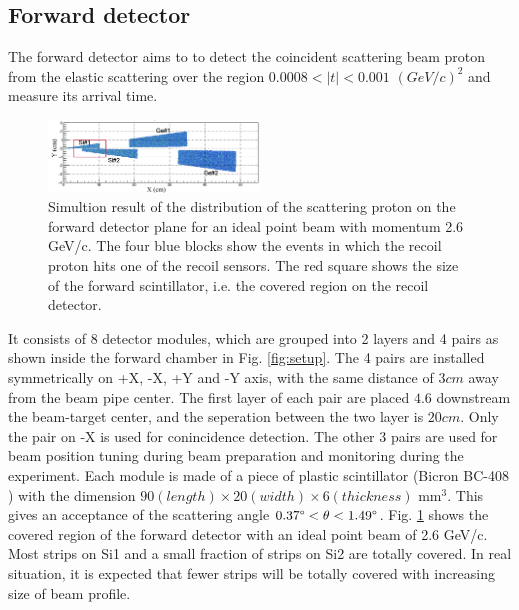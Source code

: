\documentclass[number,5p]{elsarticle}
\begin{document}
\subsection{Forward detector}
\label{sec:fwd}

The forward detector aims to to detect the coincident scattering beam proton
from the elastic scattering over the region \(0.0008 < |t| < 0.001\)
\((GeV/c)^2\) and measure its arrival time.

\begin{figure}[htbp]
  \centering
  \includegraphics[width=0.5\textwidth]{./fwd_acceptance.png}
  \caption{Simultion result of the distribution of the scattering proton on
    the forward detector plane for an ideal point beam with momentum 2.6 GeV/c.
    The four blue blocks show the events in which the recoil proton hits one of the recoil sensors.
    The red square shows the size of the forward scintillator, i.e. the covered
    region on the recoil detector.}
  \label{fig:forward_acceptance}
\end{figure}

It consists of 8 detector modules, which are grouped into 2 layers and 4 pairs
as shown inside the forward chamber in Fig. \ref{fig:setup}.
The 4 pairs are installed symmetrically on +X, -X, +Y and -Y axis, with the same
distance of $3 cm$ away from the beam pipe center.
The first layer of each pair are placed $4.6$ downstream the
beam-target center, and the seperation between the two layer is $20 cm$.
Only the pair on -X is used for conincidence detection.
The other 3 pairs are used for beam position tuning during beam preparation and
monitoring during the experiment.
Each module is made of a piece of plastic scintillator (Bicron BC-408
\cite{bc408}) with the dimension \(90 (length) \times 20 (width) \times 6 (thickness)\) mm$^3$.
This gives an acceptance of the scattering angle \(0.37\degree < \theta < 1.49\degree\).
Fig. \ref{fig:forward_acceptance} shows the covered region of the forward detector with an ideal point beam of 2.6 GeV/c.
Most strips on Si1 and a small fraction of strips on Si2 are totally covered.
In real situation, it is expected that fewer
strips will be totally covered with increasing size of beam profile.
\end{document}
